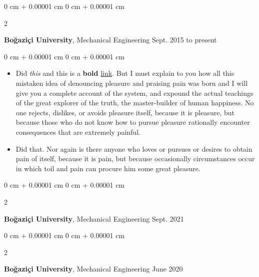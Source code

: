 \documentclass[10pt, letterpaper]{article}
\newenvironment{highlights}{
    \begin{itemize}[
        topsep=0.10 cm,
        parsep=0.10 cm,
        partopsep=0pt,
        itemsep=0pt,
        leftmargin=0 cm + 10pt
    ]
}{
    \end{itemize}
} %
\newenvironment{onecolentry}{
    \begin{adjustwidth}{
        0 cm + 0.00001 cm
    }{
        0 cm + 0.00001 cm
    }
}{
    \end{adjustwidth}
} %
\newenvironment{twocolentry}[2][]{
    \onecolentry
    \def\secondColumn{#2}
    \setcolumnwidth{\fill, 4.5 cm}
    \begin{paracol}{2}
}{
    \switchcolumn \raggedleft \secondColumn
    \end{paracol}
    \endonecolentry
} %
\begin{document}
        \vspace{0.2 cm}

        \begin{twocolentry}{
            Sept. 2015 to present
        }
            \textbf{Boğaziçi University}, Mechanical Engineering\end{twocolentry}

        \vspace{0.10 cm}
        \begin{onecolentry}
            \begin{highlights}
                \item Did \textit{this} and this is a \textbf{bold} \href{https://example.com}{link}. But I must explain to you how all this mistaken idea of denouncing pleasure and praising pain was born and I will give you a complete account of the system, and expound the actual teachings of the great explorer of the truth, the master-builder of human happiness. No one rejects, dislikes, or avoids pleasure itself, because it is pleasure, but because those who do not know how to pursue pleasure rationally encounter consequences that are extremely painful.
                \item Did that. Nor again is there anyone who loves or pursues or desires to obtain pain of itself, because it is pain, but because occasionally circumstances occur in which toil and pain can procure him some great pleasure.
            \end{highlights}
        \end{onecolentry}


        \vspace{0.2 cm}

        \begin{twocolentry}{
            Sept. 2021
        }
            \textbf{Boğaziçi University}, Mechanical Engineering\end{twocolentry}



        \vspace{0.2 cm}

        \begin{twocolentry}{
            June 2020
        }
            \textbf{Boğaziçi University}, Mechanical Engineering\end{twocolentry}
\end{document}
